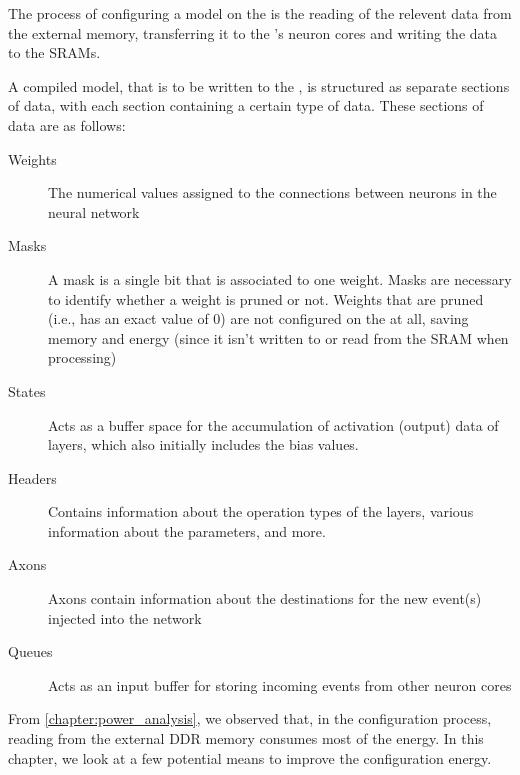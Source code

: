 The process of configuring a model on the \graicore{} is the reading of the relevent data from the external memory, transferring it to the \graicore{}'s neuron cores and writing the data to the SRAMs.

A compiled model, that is to be written to the \graicore{}, is structured as separate sections of data, with each section containing a certain type of data.
These sections of data are as follows:
\begin{description}
    \item[Weights] 
    The numerical values assigned to the connections between neurons in the neural network
    \item[Masks] 
    A mask is a single bit that is associated to one weight.
    Masks are necessary to identify whether a weight is pruned or not.
    Weights that are pruned (i.e., has an exact value of $0$) are not configured on the \graicore{} at all, saving memory and energy (since it isn't written to or read from the SRAM when processing)
    \item[States] 
    Acts as a buffer space for the accumulation of activation (output) data of layers, which also initially includes the bias values.
    \item[Headers] 
    Contains information about the operation types of the layers, various information about the parameters, and more.
    \item[Axons] 
    Axons contain information about the destinations for the new event(s) injected into the network
    \item[Queues] 
    Acts as an input buffer for storing incoming events from other neuron cores 
\end{description}

From \cref{chapter:power_analysis}, we observed that, in the configuration process, reading from the external DDR memory consumes most of the energy.
In this chapter, we look at a few potential means to improve the configuration energy.

